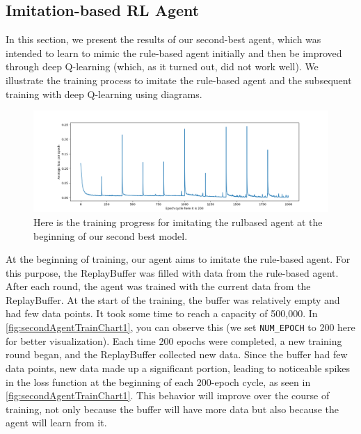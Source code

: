 
\subsection{Imitation-based RL Agent}

In this section, we present the results of our second-best agent, which was intended to learn to mimic the rule-based agent initially and 
then be improved through deep Q-learning (which, as it turned out, did not work well). We illustrate the training process to imitate the rule-based 
agent and the subsequent training with deep Q-learning using diagrams.

\begin{figure}[H]
    \centering
    
    \includegraphics[width=\oneImgWidth]{images/secondAgentTrainChart1}%
    
    \captionadjust%
    \caption{\label{fig:secondAgentTrainChart1} Here is  the training progress for imitating the rulbased agent at the beginning of our second best model.
    }%
\end{figure}

At the beginning of training, our agent aims to imitate the rule-based agent. For this purpose, the ReplayBuffer was filled with data 
from the rule-based agent. After each round, the agent was trained with the current data from the ReplayBuffer. At the start of the training, 
the buffer was relatively empty and had few data points. It took some time to reach a capacity of 500,000. In \autoref{fig:secondAgentTrainChart1}, you can observe 
this (we set \verb|NUM_EPOCH| to 200 here for better visualization). Each time 200 epochs were completed, a new training round began, and the 
ReplayBuffer collected new data. Since the buffer had few data points, new data made up a significant portion, leading to noticeable spikes 
in the loss function at the beginning of each 200-epoch cycle, as seen in \autoref{fig:secondAgentTrainChart1}. This behavior will improve over the course of training, not 
only because the buffer will have more data but also because the agent will learn from it.

